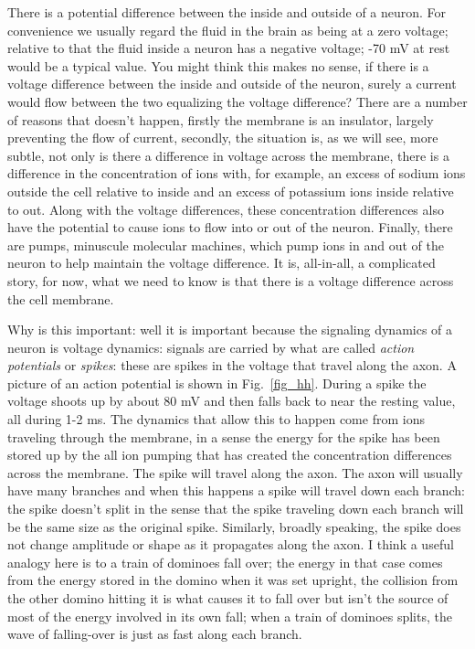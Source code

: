 \documentclass[12pt]{article}
\begin{document}
There is a potential difference between the inside and outside of a
neuron. For convenience we usually regard the fluid in the brain as
being at a zero voltage; relative to that the fluid inside a neuron
has a negative voltage; -70 mV at rest would be a typical value. You
might think this makes no sense, if there is a voltage difference
between the inside and outside of the neuron, surely a current would
flow between the two equalizing the voltage difference? There are a
number of reasons that doesn't happen, firstly the membrane is an
insulator, largely preventing the flow of current, secondly, the
situation is, as we will see, more subtle, not only is there a
difference in voltage across the membrane, there is a difference in
the concentration of ions with, for example, an excess of sodium ions
outside the cell relative to inside and an excess of potassium ions
inside relative to out. Along with the voltage differences, these
concentration differences also have the potential to cause ions to
flow into or out of the neuron. Finally, there are pumps, minuscule
molecular machines, which pump ions in and out of the neuron to help
maintain the voltage difference. It is, all-in-all, a complicated
story, for now, what we need to know is that there is a voltage
difference across the cell membrane.

Why is this important: well it is important because the signaling
dynamics of a neuron is voltage dynamics: signals are carried by what
are called \textsl{action potentials} or \textsl{spikes}: these are
spikes in the voltage that travel along the axon. A picture of an
action potential is shown in Fig.~\ref{fig_hh}. During a spike the
voltage shoots up by about 80 mV and then falls back to near the
resting value, all during 1-2 ms. The dynamics that allow this to
happen come from ions traveling through the membrane, in a sense the
energy for the spike has been stored up by the all ion pumping that
has created the concentration differences across the membrane. The
spike will travel along the axon. The axon will usually have many
branches and when this happens a spike will travel down each branch:
the spike doesn't split in the sense that the spike traveling down
each branch will be the same size as the original spike. Similarly,
broadly speaking, the spike does not change amplitude or shape as it
propagates along the axon. I think a useful analogy here is to a train
of dominoes fall over; the energy in that case comes from the energy
stored in the domino when it was set upright, the collision from the
other domino hitting it is what causes it to fall over but isn't the
source of most of the energy involved in its own fall; when a train of
dominoes splits, the wave of falling-over is just as fast along each
branch.
\end{document}
